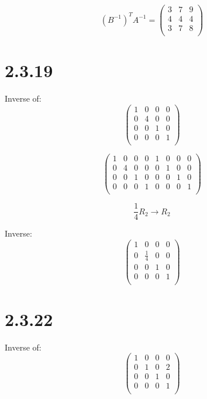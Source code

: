 \documentclass{article}
\begin{document}
\[	
	(B^{-1})^{T}A^{-1} = \left(
		\begin{array}{ccc}
			3&	7&	9\\
			4&	4&	4\\
			3&	7&	8\\
		\end{array}
	\right)
\]

\newpage
\section*{2.3.19}

Inverse of:
\[
	\left(
		\begin{array}{cccc}
			1&	0&	0&	0\\
			0&	4&	0&	0\\
			0&	0&	1&	0\\
			0&	0&	0&	1\\
		\end{array}
	\right)
\]

\[
	\left(
		\begin{array}{cccc|cccc}
			1&	0&	0&	0&	1&	0&	0&	0\\
			0&	4&	0&	0&	0&	1&	0&	0\\
			0&	0&	1&	0&	0&	0&	1&	0\\
			0&	0&	0&	1&	0&	0&	0&	1\\
		\end{array}
	\right)
\]

\[	\frac{1}{4}R_{2} \rightarrow R_{2} \]

Inverse:
\[
	\left(
		\begin{array}{cccc}
			1&	0&	0&	0\\
			0&	\frac{1}{4}&	0&	0\\
			0&	0&	1&	0\\
			0&	0&	0&	1\\
		\end{array}
	\right)
\]

\newpage

\section*{2.3.22}
Inverse of:
\[
	\left(
		\begin{array}{cccc}
			1&	0&	0&	0\\
			0&	1&	0&	2\\
			0&	0&	1&	0\\
			0&	0&	0&	1\\
		\end{array}
	\right)
\]
\end{document}
